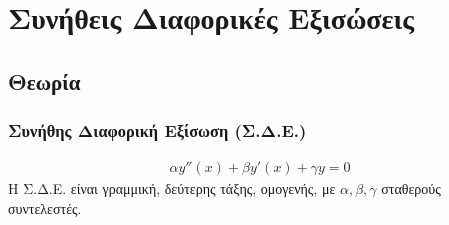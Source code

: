\documentclass[]{book}
\begin{document}
\tableofcontents
\chapter{Συνήθεις Διαφορικές Εξισώσεις}
\begin{multicols*}{2}

\section{Θεωρία}
\subsection{Συνήθης Διαφορική Εξίσωση (Σ.Δ.Ε.)}
\begin{equation*}
    \begin{aligned}
        \alpha y''(x) + \beta y' (x)+ \gamma y = 0
    \end{aligned}
\end{equation*}
Η Σ.Δ.Ε. είναι γραμμική, δεύτερης τάξης, ομογενής, με $α, β, γ$ σταθερούς συντελεστές.

\end{multicols*}
\end{document}
